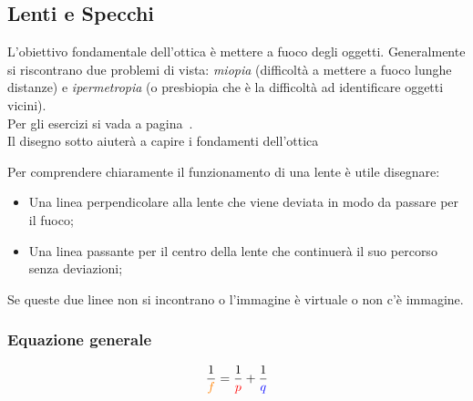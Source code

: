 \subsection{Lenti e Specchi}\label{subsec:onde:lenti}
L'obiettivo fondamentale dell'ottica è mettere a fuoco degli oggetti. Generalmente si riscontrano
due problemi di vista: \emph{miopia} (difficoltà a mettere a fuoco lunghe distanze) e 
\emph{ipermetropia} (o presbiopia che è la difficoltà ad identificare oggetti vicini).\\
Per gli esercizi si vada a pagina~\pageref{ex:lenti}.\\ [\baselineskip]
Il disegno sotto aiuterà a capire i fondamenti dell'ottica
\begin{center}
\end{center}

Per comprendere chiaramente il funzionamento di una lente è utile disegnare:
\begin{itemize}
  \item Una linea perpendicolare alla lente che viene deviata in modo da passare per il fuoco;
  \item Una linea passante per il centro della lente che continuerà il suo percorso senza 
    deviazioni;
\end{itemize}
Se queste due linee non si incontrano o l'immagine è virtuale o non c'è immagine.

\subsubsection{Equazione generale}
\begin{equation*}
  \frac{1}{\mathcolor{orange}{f}} = \frac{1}{\mathcolor{red}{p}} + \frac{1}{\mathcolor{blue}{q}}
\end{equation*}

